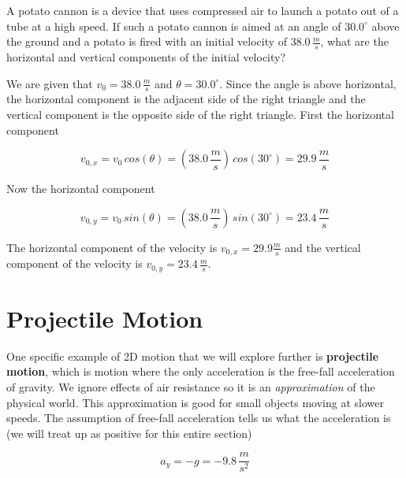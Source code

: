 \documentclass[12pt]{book}
\begin{document}
\begin{exampleblock}

A potato cannon is a device that uses compressed air to launch a potato out of a tube at a high speed. If such a potato cannon is aimed at an angle of $30.0^{\circ}$ above the ground and a potato is fired with an initial velocity of $38.0 \, \frac{m}{s}$, what are the horizontal and vertical components of the initial velocity?

\hspace{10pt}

We are given that $v_0 = 38.0 \, \frac{m}{s}$ and $\theta = 30.0^{\circ}$. Since the angle is above horizontal, the horizontal component is the adjacent side of the right triangle and the vertical component is the opposite side of the right triangle. First the horizontal component

\begin{equation}
v_{0,x} = v_0 \, cos(\theta) = (38.0 \, \frac{m}{s}) \, cos(30^{\circ}) = 29.9 \, \frac{m}{s}
\end{equation}

Now the horizontal component

\begin{equation}
v_{0,y} = v_0 \, sin(\theta) = (38.0 \, \frac{m}{s}) \, sin(30^{\circ}) = 23.4 \, \frac{m}{s}
\end{equation}

The horizontal component of the velocity is $v_{0,x} = 29.9 \frac{m}{s}$ and the vertical component of the velocity is $v_{0,y} = 23.4 \, \frac{m}{s}$.

\end{exampleblock}

\section{Projectile Motion}

One specific example of 2D motion that we will explore further is \textbf{projectile motion}, which is motion where the only acceleration is the free-fall acceleration of gravity. We ignore effects of air resistance so it is an \textit{approximation} of the physical world. This approximation is good for small objects moving at slower speeds. The assumption of free-fall acceleration tells us what the acceleration is (we will treat up as positive for this entire section)

\begin{equation}
a_y = -g = -9.8 \, \frac{m}{s^2}
\end{equation}
\end{document}
